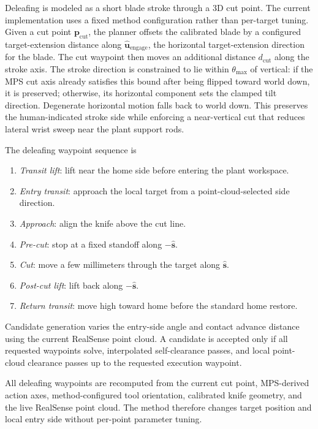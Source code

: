 Deleafing is modeled as a short blade stroke through a 3D cut point.
The current implementation uses a fixed method configuration rather
than per-target tuning.  Given a cut point
$\mathbf{p}_{\mathrm{cut}}$, the planner offsets the calibrated blade
by a configured target-extension distance along
$\hat{\mathbf{u}}_{\mathrm{engage}}$, the horizontal target-extension
direction for the blade.  The cut waypoint then moves an additional
distance $d_{\mathrm{cut}}$ along the stroke axis.  The stroke
direction is constrained to lie within $\theta_{\max}$ of vertical:
if the MPS cut axis already satisfies this bound after being flipped
toward world down, it is preserved; otherwise, its horizontal
component sets the clamped tilt direction.  Degenerate horizontal
motion falls back to world down.  This preserves the human-indicated
stroke side while enforcing a near-vertical cut that reduces lateral
wrist sweep near the plant support rods.

The deleafing waypoint sequence is
%
\begin{enumerate}
  \item \emph{Transit lift}: lift near the home side before entering
    the plant workspace.
  \item \emph{Entry transit}: approach the local target from a
    point-cloud-selected side direction.
  \item \emph{Approach}: align the knife above the cut line.
  \item \emph{Pre-cut}: stop at a fixed standoff along
    $-\hat{\mathbf{s}}$.
  \item \emph{Cut}: move a few millimeters through the target along
    $\hat{\mathbf{s}}$.
  \item \emph{Post-cut lift}: lift back along $-\hat{\mathbf{s}}$.
  \item \emph{Return transit}: move high toward home before the
    standard home restore.
\end{enumerate}
%
Candidate generation varies the entry-side angle and contact
advance distance using the current RealSense point cloud.  A candidate
is accepted only if all requested waypoints solve, interpolated
self-clearance passes, and local point-cloud clearance passes up to
the requested execution waypoint.

All deleafing waypoints are recomputed from the current cut point,
MPS-derived action axes, method-configured tool orientation,
calibrated knife geometry, and the live RealSense point cloud.  The
method therefore changes target position and local entry side without
per-point parameter tuning.


